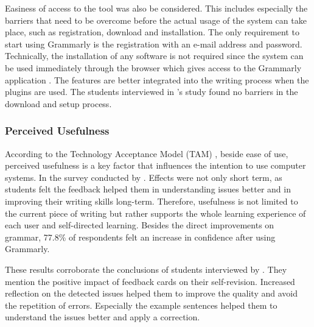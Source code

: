 \documentclass[runningheads]{llncs}
\let\OldTextregistered\textregistered
\renewcommand{\textregistered}{\OldTextregistered\xspace}
\begin{document}
Easiness of access to the tool was also be considered. This includes especially the barriers that need to be overcome before the actual usage of the system can take place, such as registration, download and installation. The only requirement to start using Grammarly\textregistered is the registration with an e-mail address and password. Technically, the installation of any software is not required since the system can be used immediately through the browser which gives access to the Grammarly\textregistered application \citep{noauthor_grammarly_nodate}. The features are better integrated into the writing process when the plugins are used. The students interviewed in \citeauthor{nova_utilizing_2018}'s study found no barriers in the download and setup process.

\subsubsection{Perceived Usefulness} 
According to the Technology Acceptance Model (TAM) \citep{davis_user_1989}, beside ease of use, perceived usefulness is a key factor that influences the intention to use computer systems. In the survey conducted by \citeauthor{cavaleri_you_2016} . Effects were not only short term, as students felt the feedback helped them in understanding issues better and in improving their writing skills long-term. Therefore, usefulness is not limited to the current piece of writing but rather supports the whole learning experience of each user and self-directed learning. Besides the direct improvements on grammar, 77.8\% of respondents felt an increase in confidence after using Grammarly\textregistered. 

These results corroborate the conclusions of students interviewed by \textcite{nova_utilizing_2018}. They mention the positive impact of feedback cards on their self-revision. Increased reflection on the detected issues helped them to improve the quality and avoid the repetition of errors. Especially the example sentences helped them to understand the issues better and apply a correction.
\end{document}
